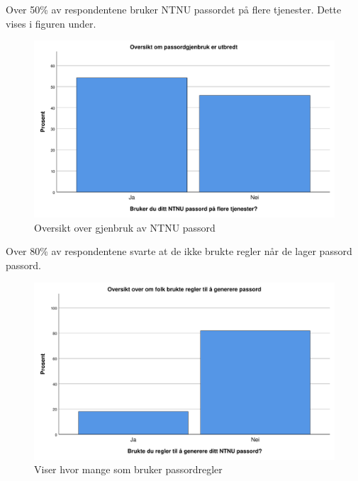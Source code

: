 Over 50\% av respondentene bruker NTNU passordet på flere tjenester. Dette vises i figuren under. 
\begin{figure}[H]
    \centering
    \includegraphics[scale=0.5]{case_2/bilder/spss/passordgjenbruk.pdf}
    \caption[Frekvens av passordgjenbruk]{Oversikt over gjenbruk av NTNU passord}
    \label{fig:case2-passordgjenbruk}
\end{figure}

Over 80\% av respondentene svarte at de ikke brukte regler når de lager passord passord.
\begin{figure}[H]
    \centering
    \includegraphics[scale=0.5]{case_2/bilder/spss/regler_passord.pdf}
    \caption[Bruk av passordregler]{Viser hvor mange som bruker passordregler}
    \label{fig:case2-passordregler}
\end{figure}

